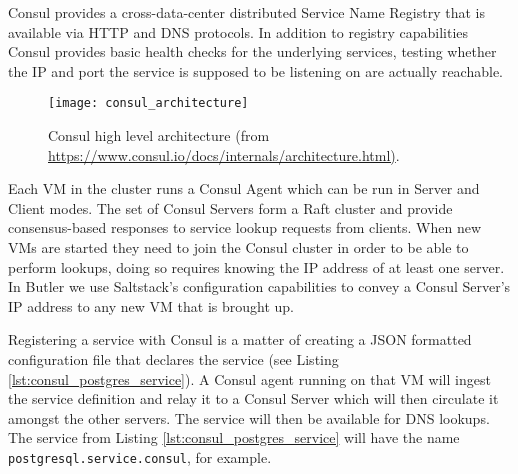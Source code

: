 Consul provides a cross-data-center distributed Service Name Registry that is available via HTTP and DNS protocols. In addition to registry capabilities Consul provides basic health checks for the underlying services, testing whether the IP and port the service is supposed to be listening on are actually reachable.

\begin{figure}[h]
\texttt{[image: consul\_architecture]}
\centering
\caption {Consul high level architecture (from \url{https://www.consul.io/docs/internals/architecture.html)}.}
\label{fig:consul_architecture}
\end{figure} 

Each VM in the cluster runs a Consul Agent which can be run in Server and Client modes. The set of Consul Servers form a Raft cluster and provide consensus-based responses to service lookup requests from clients. When new VMs are started they need to join the Consul cluster in order to be able to perform lookups, doing so requires knowing the IP address of at least one server. In Butler we use Saltstack's configuration capabilities to convey a Consul Server's IP address to any new VM that is brought up. 

Registering a service with Consul is a matter of creating a JSON formatted configuration file that declares the service (see Listing \ref{lst:consul_postgres_service}). A Consul agent running on that VM will ingest the service definition and relay it to a Consul Server which will then circulate it amongst the other servers. The service will then be available for DNS lookups. The service from Listing \ref{lst:consul_postgres_service} will have the name \texttt{postgresql.service.consul}, for example.



	